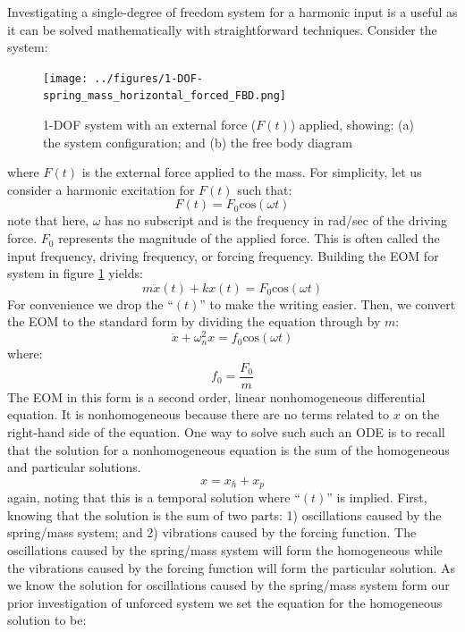 \documentclass[12pt,letter]{article}
\numberwithin{ex}{section} %
\numberwithin{re}{section} %
\begin{document}
			
			Investigating a single-degree of freedom system for a harmonic input is a useful as it can be solved mathematically with straightforward techniques. Consider the system:
			\begin{figure}[H]
				\centering
				\texttt{[image: ../figures/1-DOF-spring\_mass\_horizontal\_forced\_FBD.png]}
				\caption{1-DOF system with an external force ($F(t)$) applied, showing: (a) the system configuration; and (b) the free body diagram}
				\label{fig:1-DOF-spring_mass_horizontal_forced_FBD}
			\end{figure}	
			\noindent where $F(t)$ is the external force applied to the mass. For simplicity, let us consider a harmonic excitation for $F(t)$ such that:
			\begin{equation}
				F(t) = F_0\text{cos}(\omega t)
			\end{equation}							
			note that here, $\omega$ has no subscript and is the frequency in rad/sec of the driving force. $F_0$ represents the magnitude of the applied force. This is often called the input frequency, driving frequency, or forcing frequency. Building the EOM for system in figure \ref{fig:1-DOF-spring_mass_horizontal_forced_FBD} yields:
			\begin{equation}
				m \ddot{x}(t)+kx(t) = F_0\text{cos}(\omega t)
			\end{equation}			
			For convenience we drop the ``$(t)$'' to make the writing easier. Then, we convert the EOM to the standard form by dividing the equation through by $m$:					
			\begin{equation}
				\ddot{x}+\omega_n^2x = f_0\text{cos}(\omega t)
			\end{equation}					
			where:
			\begin{equation}
				f_0 = \frac{F_0}{m}
			\end{equation}	
			The EOM in this form is a second order, linear nonhomogeneous differential equation. It is nonhomogeneous because there are no terms related to $x$ on the right-hand side of the equation. One way to solve such such an ODE is to recall that the solution for a nonhomogeneous equation is the sum of the homogeneous and particular solutions. 
			\begin{equation}
				x = x_h + x_p
			\end{equation}	
			again, noting that this is a temporal solution where ``$(t)$'' is implied. First, knowing that the solution is the sum of two parts: 1) oscillations caused by the spring/mass system; and 2) vibrations caused by the forcing function. The oscillations caused by the spring/mass system will form the homogeneous while the vibrations caused by the forcing function will form the particular solution. As we know the solution for oscillations caused by the spring/mass system form our prior investigation of unforced system we set the equation for the homogeneous solution to be:
\end{document}
